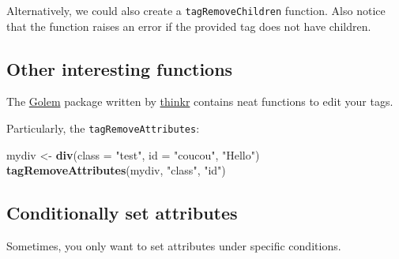 \documentclass[]{book}
\newenvironment{Shaded}{\begin{snugshade}}{\end{snugshade}}
\newcommand{\ControlFlowTok}[1]{\textcolor[rgb]{0.13,0.29,0.53}{\textbf{#1}}}
\newcommand{\DataTypeTok}[1]{\textcolor[rgb]{0.13,0.29,0.53}{#1}}
\newcommand{\KeywordTok}[1]{\textcolor[rgb]{0.13,0.29,0.53}{\textbf{#1}}}
\newcommand{\NormalTok}[1]{#1}
\newcommand{\OperatorTok}[1]{\textcolor[rgb]{0.81,0.36,0.00}{\textbf{#1}}}
\newcommand{\OtherTok}[1]{\textcolor[rgb]{0.56,0.35,0.01}{#1}}
\newcommand{\StringTok}[1]{\textcolor[rgb]{0.31,0.60,0.02}{#1}}
\begin{document}
Alternatively, we could also create a \texttt{tagRemoveChildren} function. Also notice that the function raises an error if the provided tag does not have children.

\hypertarget{other-interesting-functions}{%
\subsection{Other interesting functions}\label{other-interesting-functions}}

The \href{https://github.com/ThinkR-open/golem/blob/dev/inst/utils/golem_utils_ui.R}{Golem} package written by \href{https://thinkr.fr}{thinkr} contains neat functions to edit your tags.

Particularly, the \texttt{tagRemoveAttributes}:

\begin{Shaded}
\end{Shaded}

\begin{Shaded}
\begin{Highlighting}[]
\NormalTok{mydiv <-}\StringTok{ }\KeywordTok{div}\NormalTok{(}\DataTypeTok{class =} \StringTok{"test"}\NormalTok{, }\DataTypeTok{id =} \StringTok{"coucou"}\NormalTok{, }\StringTok{"Hello"}\NormalTok{)}
\KeywordTok{tagRemoveAttributes}\NormalTok{(mydiv, }\StringTok{"class"}\NormalTok{, }\StringTok{"id"}\NormalTok{)}
\end{Highlighting}
\end{Shaded}

\hypertarget{conditionally-set-attributes}{%
\subsection{Conditionally set attributes}\label{conditionally-set-attributes}}

Sometimes, you only want to set attributes under specific conditions.
\end{document}
